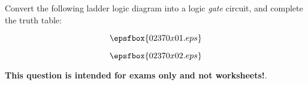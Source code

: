 

Convert the following ladder logic diagram into a logic {\it gate} circuit, and complete the truth table:

$$\epsfbox{02370x01.eps}$$







$$\epsfbox{02370x02.eps}$$







{\bf This question is intended for exams only and not worksheets!}.




